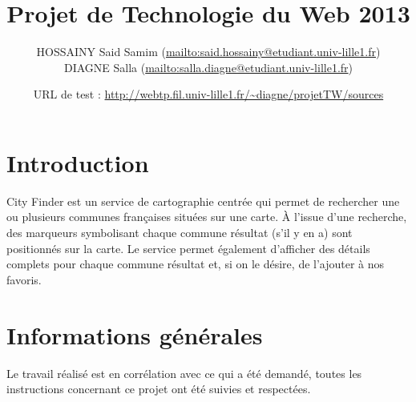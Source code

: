 \documentclass{report}
\title{Projet de Technologie du Web 2013}
\author{HOSSAINY Said Samim (\url{mailto:said.hossainy@etudiant.univ-lille1.fr}) \\ 
DIAGNE Salla (\url{mailto:salla.diagne@etudiant.univ-lille1.fr})}
\date{URL de test : \url{http://webtp.fil.univ-lille1.fr/~diagne/projetTW/sources}}
\begin{document}
\maketitle

\section*{Introduction}
\og City Finder \fg est un service de cartographie centrée qui permet de rechercher une ou plusieurs communes françaises situées sur une carte. À l'issue d'une recherche, des marqueurs symbolisant chaque commune résultat (s'il y en a) sont positionnés sur la carte. Le service permet également d'afficher des détails complets pour chaque commune résultat et, si on le désire, de l'ajouter à nos favoris.
\section*{Informations générales}
Le travail réalisé est en corrélation avec ce qui a été demandé, toutes les instructions concernant ce projet ont été suivies et respectées.
\end{document}

